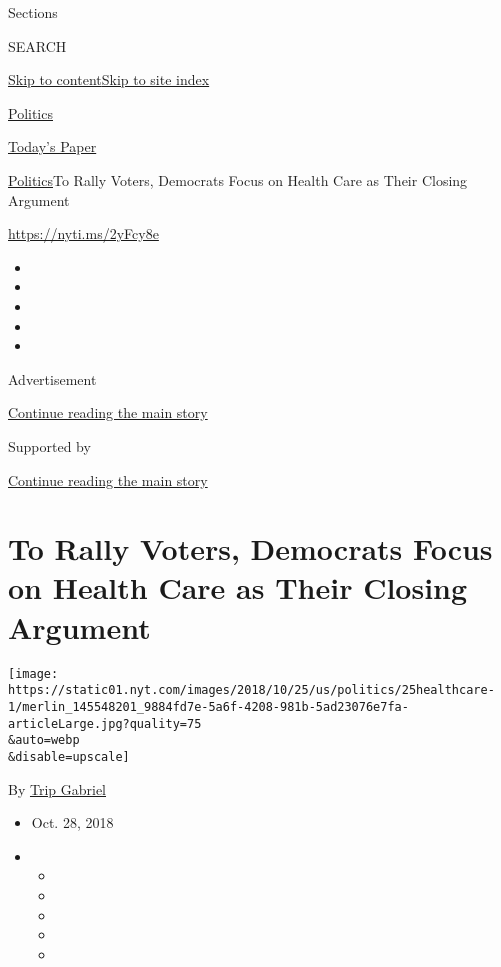 Sections

SEARCH

\protect\hyperlink{site-content}{Skip to
content}\protect\hyperlink{site-index}{Skip to site index}

\href{https://www.nytimes.com/section/politics}{Politics}

\href{https://myaccount.nytimes.com/auth/login?response_type=cookie\&client_id=vi}{}

\href{https://www.nytimes.com/section/todayspaper}{Today's Paper}

\href{/section/politics}{Politics}\textbar{}To Rally Voters, Democrats
Focus on Health Care as Their Closing Argument

\url{https://nyti.ms/2yFcy8e}

\begin{itemize}
\item
\item
\item
\item
\item
\end{itemize}

Advertisement

\protect\hyperlink{after-top}{Continue reading the main story}

Supported by

\protect\hyperlink{after-sponsor}{Continue reading the main story}

\hypertarget{to-rally-voters-democrats-focus-on-health-care-as-their-closing-argument}{%
\section{To Rally Voters, Democrats Focus on Health Care as Their
Closing
Argument}\label{to-rally-voters-democrats-focus-on-health-care-as-their-closing-argument}}

\texttt{[image: https://static01.nyt.com/images/2018/10/25/us/politics/25healthcare-1/merlin\_145548201\_9884fd7e-5a6f-4208-981b-5ad23076e7fa-articleLarge.jpg?quality=75\\\&auto=webp\\\&disable=upscale]}

By \href{https://www.nytimes.com/by/trip-gabriel}{Trip Gabriel}

\begin{itemize}
\item
  Oct. 28, 2018
\item
  \begin{itemize}
  \item
  \item
  \item
  \item
  \item
  \end{itemize}
\end{itemize}

